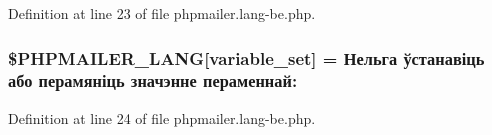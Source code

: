 Definition at line 23 of file phpmailer.\+lang-\/be.\+php.

\subsubsection[{\texorpdfstring{\$\+P\+H\+P\+M\+A\+I\+L\+E\+R\+\_\+\+L\+A\+NG}{$PHPMAILER_LANG}}]{\setlength{\rightskip}{0pt plus 5cm}\$P\+H\+P\+M\+A\+I\+L\+E\+R\+\_\+\+L\+A\+NG\mbox{[}\textquotesingle{}variable\+\_\+set\textquotesingle{}\mbox{]} = \textquotesingle{}Нельга ўстанавіць або перамяніць значэнне пераменнай\+: \textquotesingle{}}\hypertarget{phpmailer_8lang-be_8php_af795debc7a739d038742691c358d9032}{}\label{phpmailer_8lang-be_8php_af795debc7a739d038742691c358d9032}


Definition at line 24 of file phpmailer.\+lang-\/be.\+php.

